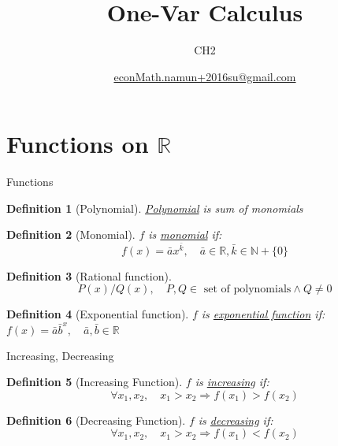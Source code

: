\documentclass[final]{beamer}
\author[조남운]{\url{econMath.namun+2016su@gmail.com}}
\title{One-Var Calculus}
\subtitle{CH2}
\newtheorem{defn}{Definition}
\begin{document}
	\maketitle


\section{Functions on $\mathbb{R}$} %
\begin{frame}[t]{Functions}

	\begin{defn}[Polynomial]
		\uline{Polynomial} is sum of monomials
	\end{defn}
	
	\begin{defn}[Monomial]
		$f$ is \uline{monomial} if:
			\[
				f(x) = \bar a x^{\bar k},\quad \bar a \in \mathbb{R}, \bar k\in \mathbb{N}+\{0\}
			\]
	\end{defn}

	\begin{defn}
		[Rational function]
		\[
			P(x)/Q(x),\quad \text{$P,Q \in$ set of polynomials} \land Q\neq 0
		\]
	\end{defn}
	
	\begin{defn}
		[Exponential function]
		$f$ is \uline{exponential function} if: $
			f(x) = \bar a {\bar b}^x,\quad \bar a, \bar b \in \mathbb{R}
		$
	\end{defn}

\end{frame}

\begin{frame}[t]{Increasing, Decreasing}
	\begin{defn}
		[Increasing Function]
		$f$ is \uline{increasing} if:\[
			\forall x_1,x_2, \quad x_1 >x_2 \Rightarrow f(x_1)>f(x_2)
		\]
	\end{defn}
	\begin{defn}
		[Decreasing Function]
		$f$ is \uline{decreasing} if:\[
			\forall x_1,x_2, \quad x_1 >x_2 \Rightarrow f(x_1)<f(x_2)
		\]
	\end{defn}
\end{frame}
\end{document}
